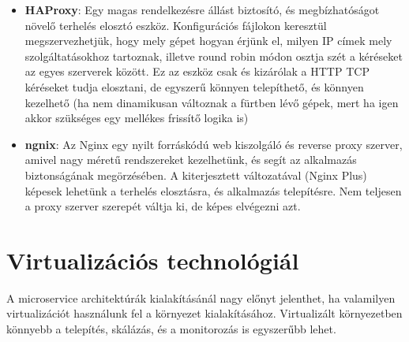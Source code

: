 \documentclass[11pt,magyar,a4paper,oneside,]{report}
\begin{document}
\begin{itemize}
\item
  \textbf{HAProxy}: Egy magas rendelkezésre állást biztosító, és
  megbízhatóságot növelő terhelés elosztó eszköz. Konfigurációs fájlokon
  keresztül megszervezhetjük, hogy mely gépet hogyan érjünk el, milyen
  IP címek mely szolgáltatásokhoz tartoznak, illetve round robin módon
  osztja szét a kéréseket az egyes szerverek között. Ez az eszköz csak
  és kizárólak a HTTP TCP kéréseket tudja elosztani, de egyszerű könnyen
  telepíthető, és könnyen kezelhető (ha nem dinamikusan változnak a
  fürtben lévő gépek, mert ha igen akkor szükséges egy mellékes frissítő
  logika is)
\item
  \textbf{ngnix}: Az Nginx egy nyilt forráskódú web kiszolgáló és
  reverse proxy szerver, amivel nagy méretű rendszereket kezelhetünk, és
  segít az alkalmazás biztonságának megörzésében. A kiterjesztett
  változatával (Nginx Plus) képesek lehetünk a terhelés elosztásra, és
  alkalmazás telepítésre. Nem teljesen a proxy szerver szerepét váltja
  ki, de képes elvégezni azt.
\end{itemize}

\section{Virtualizációs
technológiál}\label{virtualizuxe1ciuxf3s-technoluxf3giuxe1l}

A microservice architektúrák kialakításánál nagy előnyt jelenthet, ha
valamilyen virtualizációt használunk fel a környezet kialakításához.
Virtualizált környezetben könnyebb a telepítés, skálázás, és a
monitorozás is egyszerűbb lehet.
\end{document}
